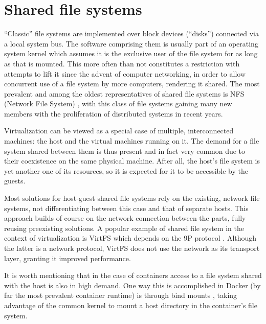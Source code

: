 

\section{Shared file systems}

``Classic'' file systems are implemented over block devices (``disks'')
connected via a local system bus. The software comprising them is usually part
of an operating system kernel which assumes it is the exclusive user of the file
system for as long as that is mounted. This more often than not constitutes a
restriction with attempts to lift it since the advent of computer networking,
in order to allow concurrent use of a file system by more computers, rendering
it shared. The most prevalent and among the oldest representatives of shared
file systems is NFS (Network File System) \cite{nfs}, with this class of file
systems gaining many new members with the proliferation of distributed systems
in recent years.

Virtualization can be viewed as a special case of multiple, interconnected
machines: the host and the virtual machines running on it. The demand for a
file system shared between them is thus present and in fact very common due to
their coexistence on the same physical machine. After all, the host's file
system is yet another one of its resources, so it is expected for it to be
accessible by the guests.

Most solutions for host-guest shared file systems rely on the existing,
network file systems, not differentiating between this case and that of separate
hosts. This approach builds of course on the network connection between the
parts, fully reusing preexisting solutions. A popular example of shared file
system in the context of virtualization is VirtFS \cite{virtfs} which depends on
the 9P protocol \cite{9p}. Although the latter is a network protocol, VirtFS
does not use the network as its transport layer, granting it improved
performance.

It is worth mentioning that in the case of containers access to a file system
shared with the host is also in high demand. One way this is accomplished in
Docker \cite{docker} (by far the most prevalent container runtime) is through
bind mounts \cite{docker:bind-mounts}, taking advantage of the common kernel to
mount a host directory in the container's file system.

